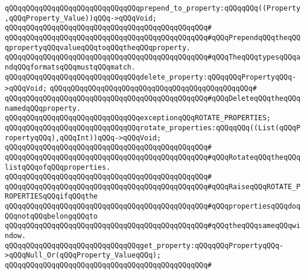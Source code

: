 \newline
\newline
\verb|qQQqqQQqqQQqqQQqqQQqqQQqqQQqqQQqprepend_to_property:qQQqqQQq((Property,qQQqProperty_Value))qQQq->qQQqVoid;|\newline
\verb|qQQqqQQqqQQqqQQqqQQqqQQqqQQqqQQqqQQqqQQqqQQqqQQq#|\newline
\verb|qQQqqQQqqQQqqQQqqQQqqQQqqQQqqQQqqQQqqQQqqQQqqQQq#qQQqPrependqQQqtheqQQqpropertyqQQqvalueqQQqtoqQQqtheqQQqproperty.|\newline
\verb|qQQqqQQqqQQqqQQqqQQqqQQqqQQqqQQqqQQqqQQqqQQqqQQq#qQQqTheqQQqtypesqQQqandqQQqformatsqQQqmustqQQqmatch.|\newline
\newline
\newline
\verb|qQQqqQQqqQQqqQQqqQQqqQQqqQQqqQQqdelete_property:qQQqqQQqPropertyqQQq->qQQqVoid;|\newline
\verb|qQQqqQQqqQQqqQQqqQQqqQQqqQQqqQQqqQQqqQQqqQQqqQQq#|\newline
\verb|qQQqqQQqqQQqqQQqqQQqqQQqqQQqqQQqqQQqqQQqqQQqqQQq#qQQqDeleteqQQqtheqQQqnamedqQQqproperty.|\newline
\newline
\verb|qQQqqQQqqQQqqQQqqQQqqQQqqQQqqQQqexceptionqQQqROTATE_PROPERTIES;|\newline
\newline
\verb|qQQqqQQqqQQqqQQqqQQqqQQqqQQqqQQqrotate_properties:qQQqqQQq((List(qQQqPropertyqQQq),qQQqInt))qQQq->qQQqVoid;|\newline
\verb|qQQqqQQqqQQqqQQqqQQqqQQqqQQqqQQqqQQqqQQqqQQqqQQq#|\newline
\verb|qQQqqQQqqQQqqQQqqQQqqQQqqQQqqQQqqQQqqQQqqQQqqQQq#qQQqRotateqQQqtheqQQqlistqQQqofqQQqproperties.|\newline
\verb|qQQqqQQqqQQqqQQqqQQqqQQqqQQqqQQqqQQqqQQqqQQqqQQq#|\newline
\verb|qQQqqQQqqQQqqQQqqQQqqQQqqQQqqQQqqQQqqQQqqQQqqQQq#qQQqRaiseqQQqROTATE_PROPERTIESqQQqifqQQqthe|\newline
\verb|qQQqqQQqqQQqqQQqqQQqqQQqqQQqqQQqqQQqqQQqqQQqqQQq#qQQqpropertiesqQQqdoqQQqnotqQQqbelongqQQqto|\newline
\verb|qQQqqQQqqQQqqQQqqQQqqQQqqQQqqQQqqQQqqQQqqQQqqQQq#qQQqtheqQQqsameqQQqwindow.|\newline
\newline
\newline
\verb|qQQqqQQqqQQqqQQqqQQqqQQqqQQqqQQqget_property:qQQqqQQqPropertyqQQq->qQQqNull_Or(qQQqProperty_ValueqQQq);|\newline
\verb|qQQqqQQqqQQqqQQqqQQqqQQqqQQqqQQqqQQqqQQqqQQqqQQq#|\newline
